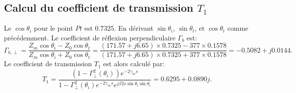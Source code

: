 \subsection*{Calcul du coefficient de transmission $T_1$}
Le $\cos \theta_i$ pour le point $Pt$ est $0.7325$. En dérivant $\sin \theta_i$, $\sin \theta_t$, et $\cos \theta_t$ comme précédemment. Le coefficient de réflexion perpendiculaire $\Gamma_b$ est:
\[
\Gamma_{b,\perp} = \frac{Z_m \cos \theta_i - Z_0 \cos \theta_t}{Z_m \cos \theta_i + Z_0 \cos \theta_t} = \frac{(171.57 + j6.65) \times 0.7325 - 377 \times 0.1578}{(171.57 + j6.65) \times 0.7325 + 377 \times 0.1578} = -0.5082 + j0.0144.
\]
Le coefficient de transmission $T_1$ est alors calculé par:
\[
T_1 = \frac{ (1 - \Gamma^2_{\perp}(\theta_i)) e^{-2\gamma_m s}}{1 - \Gamma^2_{\perp}(\theta_i) e^{-2\gamma_m s} e^{j\beta2s \sin \theta_t \sin \theta_i}} = 0.6295 + 0.0890j.
\]



